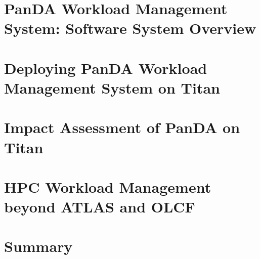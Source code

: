 \documentclass[smallextended]{svjour3}      %
\begin{document}
\section{PanDA Workload Management System: Software System Overview}
\label{sec:overview}



\section{Deploying PanDA Workload Management System on Titan}
\label{sec:deploying}



\section{Impact Assessment of PanDA on Titan}
\label{sec:impact-assessment}




\section{HPC Workload Management beyond ATLAS and OLCF}
\label{sec:beyond-atlas-and-olcf}




\section{Summary}
\label{sec:summary}

\end{document}

